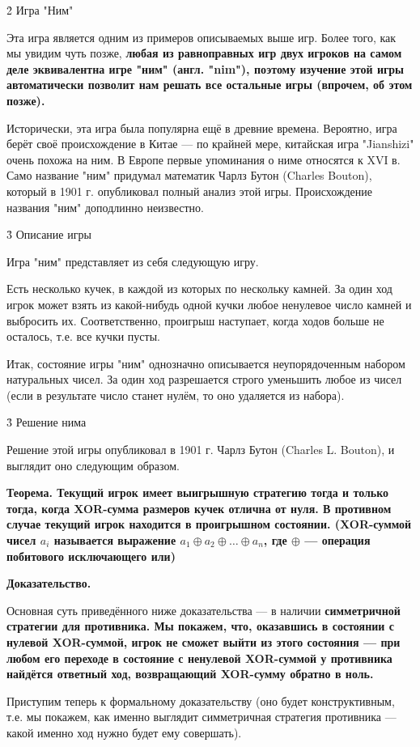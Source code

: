 \h2{ Игра "Ним" }

Эта игра является одним из примеров описываемых выше игр. Более того, как мы увидим чуть позже, \bf{любая} из равноправных игр двух игроков на самом деле эквивалентна игре "ним" (англ. "nim"), поэтому изучение этой игры автоматически позволит нам решать все остальные игры (впрочем, об этом позже).

Исторически, эта игра была популярна ещё в древние времена. Вероятно, игра берёт своё происхождение в Китае --- по крайней мере, китайская игра "Jianshizi" очень похожа на ним. В Европе первые упоминания о ниме относятся к XVI в. Само название "ним" придумал математик Чарлз Бутон (Charles Bouton), который в 1901 г. опубликовал полный анализ этой игры. Происхождение названия "ним" доподлинно неизвестно.


\h3{ Описание игры }

Игра "ним" представляет из себя следующую игру.

Есть несколько кучек, в каждой из которых по нескольку камней. За один ход игрок может взять из какой-нибудь одной кучки любое ненулевое число камней и выбросить их. Соответственно, проигрыш наступает, когда ходов больше не осталось, т.е. все кучки пусты.

Итак, состояние игры "ним" однозначно описывается неупорядоченным набором натуральных чисел. За один ход разрешается строго уменьшить любое из чисел (если в результате число станет нулём, то оно удаляется из набора).


\h3{ Решение нима }

Решение этой игры опубликовал в 1901 г. Чарлз Бутон (Charles L. Bouton), и выглядит оно следующим образом.

\bf{Теорема}. Текущий игрок имеет выигрышную стратегию тогда и только тогда, когда XOR-сумма размеров кучек отлична от нуля. В противном случае текущий игрок находится в проигрышном состоянии. (XOR-суммой чисел $a_i$ называется выражение $a_1 \oplus a_2 \oplus \ldots \oplus a_n$, где $\oplus$ --- операция побитового исключающего или)

\bf{Доказательство}.

Основная суть приведённого ниже доказательства --- в наличии \bf{симметричной стратегии для противника}. Мы покажем, что, оказавшись в состоянии с нулевой XOR-суммой, игрок не сможет выйти из этого состояния --- при любом его переходе в состояние с ненулевой XOR-суммой у противника найдётся ответный ход, возвращающий XOR-сумму обратно в ноль.

Приступим теперь к формальному доказательству (оно будет конструктивным, т.е. мы покажем, как именно выглядит симметричная стратегия противника --- какой именно ход нужно будет ему совершать).

